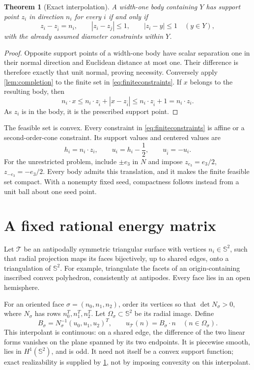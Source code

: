 \documentclass[11pt]{article}
\newtheorem{theorem}{Theorem}[section]
\theoremstyle{remark}\newtheorem{remark}[theorem]{Remark}
\newcommand{\Sph}{\mathbb S^2}
\numberwithin{equation}{section}
\begin{document}
\begin{theorem}[Exact interpolation]\label{thm:interpolation}
A width-one body containing $Y$ has support point $z_i$ in direction $n_i$
for every $i$ if and only if
\begin{equation}\label{eq:finiteconstraints}
 \boxed{z_i-z_{\bar i}=n_i,\qquad
 |z_i-z_j|\le1,\qquad |z_i-y|\le1\quad(y\in Y),}
\end{equation}
with the already assumed diameter constraints within $Y$.
\end{theorem}
\begin{proof}
Opposite support points of a width-one body have scalar separation one in
their normal direction and Euclidean distance at most one. Their difference
is therefore exactly that unit normal, proving necessity.
Conversely apply \cref{lem:completion} to the finite set in
\cref{eq:finiteconstraints}. If $x$ belongs to the resulting body, then
\[
 n_i\cdot x\le n_i\cdot z_{\bar i}+|x-z_{\bar i}|
 \le n_i\cdot z_{\bar i}+1=n_i\cdot z_i.
\]
As $z_i$ is in the body, it is the prescribed support point.
\end{proof}

The feasible set is convex. Every constraint in \cref{eq:finiteconstraints}
is affine or a second-order-cone constraint. Its support values and centered
values are
\[
 h_i=n_i\cdot z_i,\qquad u_i=h_i-\frac12,
 \qquad u_{\bar i}=-u_i.
\]
For the unrestricted problem, include $\pm e_3$ in $N$ and impose
$z_{e_3}=e_3/2$, $z_{-e_3}=-e_3/2$. Every body admits this translation,
and it makes the finite feasible set compact. With a nonempty fixed seed,
compactness follows instead from a unit ball about one seed point.

\section{A fixed rational energy matrix}
Let $\mathcal T$ be an antipodally symmetric triangular surface with vertices
$n_i\in\Sph$, such that radial projection maps its faces bijectively, up to
shared edges, onto a triangulation of $\Sph$. For example, triangulate the
facets of an origin-containing inscribed convex polyhedron, consistently at
antipodes. Every face lies in an open hemisphere.

For an oriented face $\sigma=(n_0,n_1,n_2)$, order its vertices so that
$\det N_\sigma>0$, where $N_\sigma$ has rows $n_0^T,n_1^T,n_2^T$.
Let $\Omega_\sigma\subset\Sph$ be its radial image. Define
\[
 B_\sigma=N_\sigma^{-1}(u_0,u_1,u_2)^T,\qquad
 u_{\mathcal T}(n)=B_\sigma\cdot n\quad(n\in\Omega_\sigma).
\]
This interpolant is continuous: on a shared edge, the difference of the two
linear forms vanishes on the plane spanned by its two endpoints.
It is piecewise smooth, lies in $H^1(\Sph)$, and is odd.
It need not itself be a convex support function; exact realizability is
supplied by \cref{thm:interpolation}, not by imposing convexity on this
interpolant.
\end{document}
